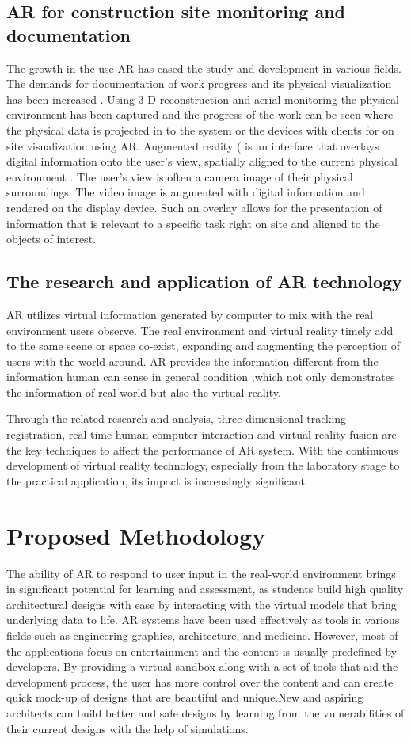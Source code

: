 \documentclass[conference]{IEEEtran}
\begin{document}
\subsection{AR for construction site monitoring and documentation}
The growth in the use AR has eased the study and development in various fields. The demands for documentation of work progress and its physical visualization has been increased . Using 3-D reconstruction and aerial monitoring the physical environment has been captured and the progress of the work can be seen where the physical data is projected in to the system or the devices with clients for on site visualization using AR\cite{sitemonitoring}. Augmented reality ( is an interface that overlays digital information onto the user's view, spatially aligned to the current physical environment . The user's view is often a camera image of their physical surroundings. The video image is augmented with digital information and rendered on the display device. Such an overlay allows for the presentation of information that is relevant to a specific task right on site and aligned to the objects of interest.
\subsection{The research and application of AR technology}
AR  utilizes virtual information generated by computer to mix with the real environment users observe. The real environment and virtual reality timely add to the same scene or space co-exist, expanding and augmenting the perception of users with the  world around. AR provides the information different from the information human can sense in general condition ,which not only demonstrates the information of real world but also the virtual reality.

Through the related research and analysis, three-dimensional tracking registration, real-time human-computer interaction and virtual reality fusion are the key techniques to affect the performance of AR system\cite{researchar}. With the continuous development of virtual reality technology, especially from the laboratory stage to the practical application, its impact is increasingly significant.
\section{Proposed Methodology}
The ability of AR to respond to user input in the real-world environment brings in significant potential for learning and assessment, as students build high quality architectural designs with ease by interacting with the virtual models that bring underlying data to life. AR systems have been used effectively as tools in various fields such as engineering graphics, architecture, and medicine. However, most of the applications focus on entertainment and the content is usually predefined by developers. By providing a virtual sandbox along with a set of tools that aid the development process, the user has more control over the content and can create quick mock-up of designs that are beautiful and unique.New and aspiring architects can build better and safe designs by learning from the vulnerabilities of their current designs with the help of simulations.
\end{document}
